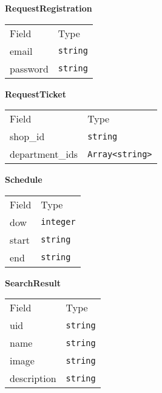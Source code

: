     \begin{table}[H]
    \centering
    \textbf{RequestRegistration}\\
    \everyrow{\tabucline[0.5pt]-}
    \begin{tabu} to 0.55\textwidth {|X|X|} \hline
    Field & Type \\
    email & \texttt{string} \\
password & \texttt{string} \\
\end{tabu}
\end{table}


    \begin{table}[H]
    \centering
    \textbf{RequestTicket}\\
    \everyrow{\tabucline[0.5pt]-}
    \begin{tabu} to 0.55\textwidth {|X|X|} \hline
    Field & Type \\
    shop\_id & \texttt{string} \\
department\_ids & \texttt{Array<string>} \\
\end{tabu}
\end{table}


    \begin{table}[H]
    \centering
    \textbf{Schedule}\\
    \everyrow{\tabucline[0.5pt]-}
    \begin{tabu} to 0.55\textwidth {|X|X|} \hline
    Field & Type \\
    dow & \texttt{integer} \\
start & \texttt{string} \\
end & \texttt{string} \\
\end{tabu}
\end{table}


    \begin{table}[H]
    \centering
    \textbf{SearchResult}\\
    \everyrow{\tabucline[0.5pt]-}
    \begin{tabu} to 0.55\textwidth {|X|X|} \hline
    Field & Type \\
    uid & \texttt{string} \\
name & \texttt{string} \\
image & \texttt{string} \\
description & \texttt{string} \\
\end{tabu}
\end{table}



